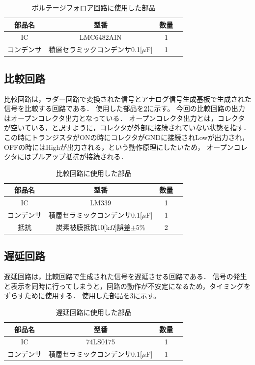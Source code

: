 \documentclass[a4paper,11pt,dvipdfmx]{jsarticle}
\begin{document}
\begin{table}[H]
  \centering
  \caption{ボルテージフォロア回路に使用した部品}
  \begin{tabular}{|c|c|c|c|}
    \hline
    部品名 & 型番 & 数量  \\
    \hline
    IC & LMC6482AIN & 1  \\
    コンデンサ & 積層セラミックコンデンサ0.1[\rm{$\mu$}F] & 1  \\
    \hline
  \end{tabular}
  \label{tab:voltagefollowerparts}
\end{table}

\subsection{比較回路}
比較回路は，ラダー回路で変換された信号とアナログ信号生成基板で生成された信号を比較する回路である．
使用した部品を\ref{tab:comparatorparts}に示す。
今回の比較回路の出力はオープンコレクタ出力となっている．
オープンコレクタ出力とは，コレクタが空いている，と訳すように，コレクタが外部に接続されていない状態を指す．
この時にトランジスタがONの時にコレクタがGNDに接続されLowが出力され，OFFの時にはHighが出力される，という動作原理にしたいため，
オープンコレクタにはプルアップ抵抗が接続される．

\begin{table}[H]
  \centering
  \caption{比較回路に使用した部品}
  \begin{tabular}{|c|c|c|c|}
    \hline
    部品名 & 型番 & 数量  \\
    \hline
    IC & LM339 & 1  \\
    コンデンサ & 積層セラミックコンデンサ0.1[\rm{$\mu$}F] & 1  \\
    抵抗 & 炭素被膜抵抗10[k$\Omega$]誤差$\pm$5\% & 2  \\
    \hline
  \end{tabular}
  \label{tab:comparatorparts}
\end{table}

\subsection{遅延回路}
遅延回路は，比較回路で生成された信号を遅延させる回路である．
信号の発生と表示を同時に行ってしまうと，回路の動作が不安定になるため，タイミングをずらすために使用する．
使用した部品を\ref{tab:delayparts}に示す。

\begin{table}[H]
  \centering
  \caption{遅延回路に使用した部品}
  \begin{tabular}{|c|c|c|c|}
    \hline
    部品名 & 型番 & 数量  \\
    \hline
    IC & 74LS0175 & 1  \\
    コンデンサ & 積層セラミックコンデンサ0.1[\rm{$\mu$}F] & 1  \\
    \hline
  \end{tabular}
  \label{tab:delayparts}
\end{table}
\end{document}
